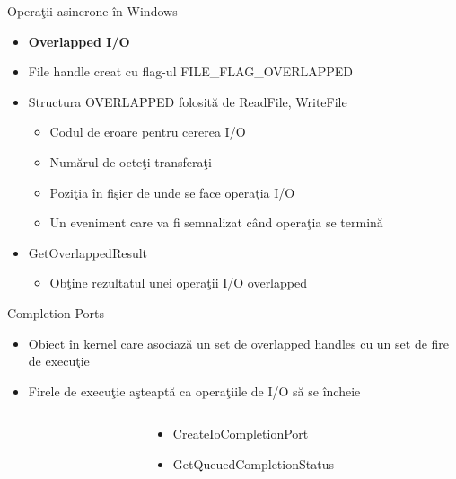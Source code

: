 \documentclass{so.cs.pub.ro}
\begin{document}
\begin{frame}{Operaţii asincrone în Windows}
  \begin{itemize}    %
    \item \textbf{Overlapped I/O}
\vspace*{0.2cm}
    \item File handle creat cu flag-ul FILE_FLAG_OVERLAPPED
\vspace*{0.2cm}
    \item Structura OVERLAPPED folosită de ReadFile, WriteFile
	\begin{itemize}
	\item Codul de eroare pentru cererea I/O
	\item Numărul de octeţi transferaţi
	\item Poziţia în fişier de unde se face operaţia I/O
	\item Un eveniment care va fi semnalizat când operaţia se termină
        \end{itemize}
\vspace*{0.2cm}
    \item GetOverlappedResult
	\begin{itemize}
	\item Obţine rezultatul unei operaţii I/O overlapped
	\end{itemize}
  \end{itemize}
\end{frame}

\begin{frame}{Completion Ports}
  \begin{itemize}    %
    \item Obiect în kernel care asociază un set de overlapped handles cu un set de fire de execuţie
    \item Firele de execuţie aşteaptă ca operaţiile de I/O să se încheie
  \end{itemize}
\begin{columns}
  \begin{column}[1]{0.48\textwidth}
  \end{column}
  \begin{column}[1]{0.52\textwidth}
  \begin{itemize}
    \item CreateIoCompletionPort
    \item GetQueuedCompletionStatus
  \end{itemize}
  \end{column}
\end{columns}
\end{frame}
\end{document}
